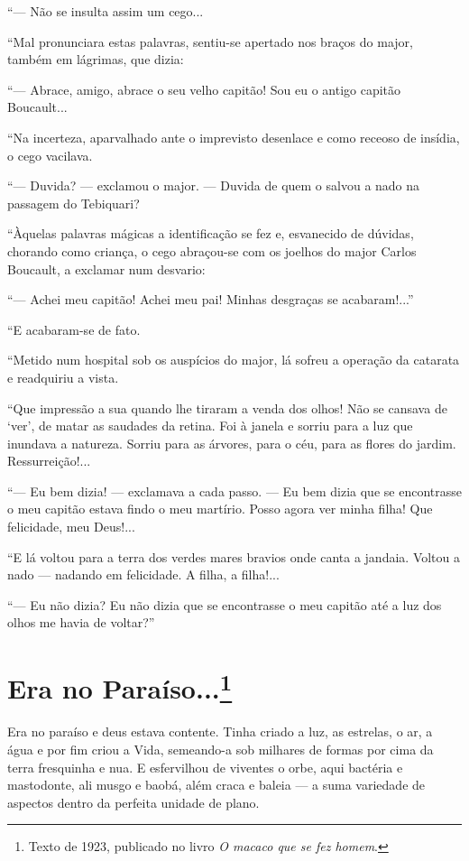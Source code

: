 ``--- Não se insulta assim um cego...

``Mal pronunciara estas palavras, sentiu-se apertado nos braços do
major, também em lágrimas, que dizia:

``--- Abrace, amigo, abrace o seu velho capitão! Sou eu o antigo capitão
Boucault...

``Na incerteza, aparvalhado ante o imprevisto desenlace e como receoso
de insídia, o cego vacilava.

``--- Duvida? --- exclamou o major. --- Duvida de quem o salvou a nado
na passagem do Tebiquari?

``Àquelas palavras mágicas a identificação se fez e, esvanecido de
dúvidas, chorando como criança, o cego abraçou-se com os joelhos do
major Carlos Boucault, a exclamar num desvario:

``--- Achei meu capitão! Achei meu pai! Minhas desgraças se
acabaram!...''

``E acabaram-se de fato.

``Metido num hospital sob os auspícios do major, lá sofreu a operação da
catarata e readquiriu a vista.

``Que impressão a sua quando lhe tiraram a venda dos olhos! Não se
cansava de `ver', de matar as saudades da retina. Foi à janela e sorriu
para a luz que inundava a natureza. Sorriu para as árvores, para o céu,
para as flores do jardim. Ressurreição!...

``--- Eu bem dizia! --- exclamava a cada passo. --- Eu bem dizia que se
encontrasse o meu capitão estava findo o meu martírio. Posso agora ver
minha filha! Que felicidade, meu Deus!...

``E lá voltou para a terra dos verdes mares bravios onde canta a
jandaia. Voltou a nado --- nadando em felicidade. A filha, a filha!...

``--- Eu não dizia? Eu não dizia que se encontrasse o meu capitão até a
luz dos olhos me havia de voltar?''

\chapter{Era no Paraíso...\footnote[*]{Texto de 1923, publicado no livro \emph{O macaco que se fez homem}.}}

Era no paraíso e deus estava contente. Tinha criado a luz, as estrelas,
o ar, a água e por fim criou a Vida, semeando-a sob milhares de formas
por cima da terra fresquinha e nua. E esfervilhou de viventes o orbe,
aqui bactéria e mastodonte, ali musgo e baobá, além craca e baleia --- a
suma variedade de aspectos dentro da perfeita unidade de plano.

